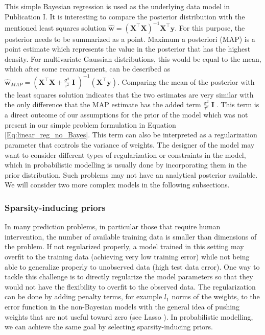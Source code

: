 \documentclass[dissertation,math,vertlayout,pdfa,colorlinks]{aaltoseries}
\newcommand{\bw}{\bm{w}}
\newcommand{\bX}{\bm{X}}
\newcommand{\by}{\bm{y}}
\DeclareMathOperator{\eye}{\textbf{I}}
\newcommand{\tp}{^{\top}}
\begin{document}
This simple Bayesian regression is used as the underlying data model in Publication I. It is interesting to compare the posterior distribution with the mentioned least squares solution $\hat{\bw} = (\bX \tp \bX)^{-1}\bX\tp \by$. For this purpose, the posterior needs to be summarized as a point. Maximum a posteriori (MAP) is a point estimate which represents the value in the posterior that has the highest density. For multivariate Gaussian distributions, this would be equal to the mean, which after some rearrangement, can be described as $\hat{\bw}_{MAP} = (\bX\tp\bX + \frac{\sigma^{2}}{\tau^{2}} \eye )^{-1}(\bX\tp\by)$. Comparing the mean of the posterior with the least squares solution indicates that the two estimates are very similar with the only difference that the MAP estimate has the added term $\frac{\sigma^{2}}{\tau^{2}} \eye$. This term is a direct outcome of our assumptions for the prior of the model which was not present in our simple problem formulation in Equation \ref{Eq:linear_reg_no_Bayes}. This term can also be interpreted as a regularization parameter that controls the variance of weights. The designer of the model may want to consider different types of regularization or constraints in the model, which in probabilistic modelling is usually done by incorporating them in the prior distribution. Such problems may not have an analytical posterior available. We will consider two more complex models in the following subsections.


\subsubsection{Sparsity-inducing priors}

In many prediction problems, in particular those that require human intervention, the number of available training data is smaller than dimensions of the problem. If not regularized properly, a model trained in this setting may overfit to the training data (achieving very low training error) while not being able to generalize properly to unobserved data (high test data error). One way to tackle this challenge is to directly regularize the model parameters so that they would not have the flexibility to overfit to the observed data. The regularization can be done by adding penalty terms, for example $l_1$ norms of the weights, to the error function in the non-Bayesian models with the general idea of pushing weights that are not useful toward zero (see Lasso \cite{lasso2011}). In probabilistic modelling, we can achieve the same goal by selecting sparsity-inducing priors. 
\end{document}
